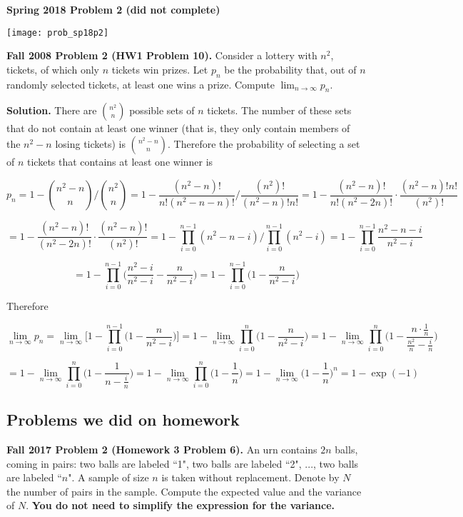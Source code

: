 \textbf{Spring 2018 Problem 2 (did not complete)}

\texttt{[image: prob\_sp18p2]}

\textbf{Fall 2008 Problem 2 (HW1 Problem 10).} Consider a lottery with \(n^2\), tickets, of which only \(n\) tickets win prizes. Let \(p_n\) be the probability that, out of \(n\) randomly selected tickets, at least one wins a prize. Compute \(\lim_{n \to \infty} p_n\).

\textbf{Solution.} There are \(\binom{n^2}{n}\) possible sets of \(n\) tickets. The number of these sets that do not contain at least one winner (that is, they only contain members of the \(n^2 - n\) losing tickets) is \(\binom{n^2 - n}{n}\). Therefore the probability of selecting a set of \(n\) tickets that contains at least one winner is

\[
p_n = 1 - \binom{n^2 - n}{n} \bigg/ \binom{n^2}{n} = 1 - \frac{(n^2 - n)!}{n!(n^2 - n - n)!} \bigg/ \frac{(n^2)!}{(n^2 - n)!n!} = 1 - \frac{(n^2 - n)!}{n!(n^2 - 2n)!} \cdot \frac{(n^2 - n)!n!}{(n^2)!}
\]

\[
 = 1 - \frac{(n^2 - n)!}{(n^2 - 2n)!} \cdot \frac{(n^2 - n)!}{(n^2)!} = 1 - \prod_{i=0}^{n-1}(n^2 - n - i)  \bigg/ \prod_{i=0}^{n-1}(n^2 - i) = 1 - \prod_{i=0}^{n-1} \frac{n^2 - n - i}{n^2 - i}
\]

\[
= 1 - \prod_{i=0}^{n-1}\bigg( \frac{n^2 - i}{n^2 - i} -\frac{n}{n^2 - i} \bigg) = 1 - \prod_{i=0}^{n-1}\bigg(1-\frac{n}{n^2 - i} \bigg)
\]

Therefore

\[
\lim_{n \to \infty} p_n = \lim_{n \to \infty} \bigg[ 1 - \prod_{i=0}^{n-1}\bigg(1-\frac{n}{n^2 - i} \bigg) \bigg] = 1 - \lim_{n \to \infty} \prod_{i=0}^{n}\bigg(1-\frac{n}{n^2 - i} \bigg) = 1 - \lim_{n \to \infty} \prod_{i=0}^{n}\bigg(1-\frac{n \cdot \frac{1}{n}}{\frac{n^2}{n} - \frac{i}{n}} \bigg)
\]

\[
= 1 - \lim_{n \to \infty} \prod_{i=0}^{n}\bigg(1-\frac{1}{n - \frac{i}{n}} \bigg) = 1 - \lim_{n \to \infty} \prod_{i=0}^{n}\bigg(1-\frac{1}{n} \bigg) = 1 - \lim_{n \to \infty}  \bigg(1 - \frac{1}{n} \bigg)^n = \boxed{1 - \exp(-1)}
\]

%
%
%
%
%
%
%
%
%
%

\subsection{Problems we did on homework}

\textbf{Fall 2017 Problem 2 (Homework 3 Problem 6).} An urn contains \(2n\) balls, coming in pairs: two balls are labeled ``1", two balls are labeled ``2", ..., two balls are labeled ``\(n\)". A sample of size \(n\) is taken without replacement. Denote by \(N\) the number of pairs in the sample. Compute the expected value and the variance of \(N\). \textbf{You do not need to simplify the expression for the variance.}

